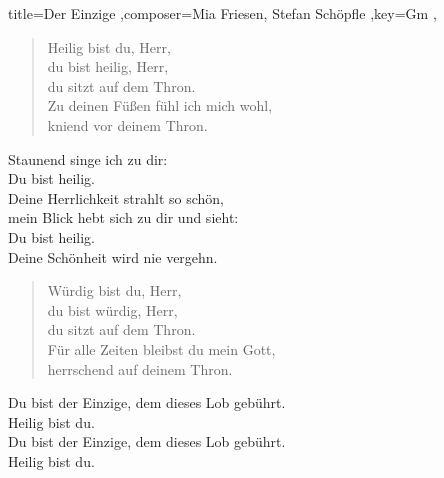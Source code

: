 \documentclass[]{leadsheet}
\begin{document}
\begin{song}{title={Der Einzige
},composer={Mia Friesen, Stefan Schöpfle
},key={Gm
},}
\begin{verse}
Heilig bist du, Herr, \\
du bist heilig, Herr, \\
du sitzt auf dem Thron. \\
Zu deinen Füßen fühl ich mich wohl, \\
kniend vor deinem Thron. \\
\end{verse}

\begin{chorus}
Staunend singe ich zu dir: \\
Du bist heilig. \\
Deine Herrlichkeit strahlt so schön, \\
mein Blick hebt sich zu dir und sieht: \\
Du bist heilig. \\
Deine Schönheit wird nie vergehn. \\
\end{chorus}

\begin{verse}
Würdig bist du, Herr, \\
du bist würdig, Herr, \\
du sitzt auf dem Thron. \\
Für alle Zeiten bleibst du mein Gott, \\
herrschend auf deinem Thron. \\
\end{verse}

\begin{bridge}
Du bist der Einzige, dem dieses Lob gebührt. \\
Heilig bist du. \\
Du bist der Einzige, dem dieses Lob gebührt. \\
Heilig bist du. \\
\end{bridge}

\end{song}
\end{document}
